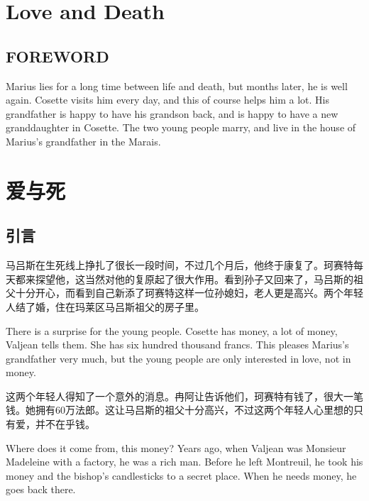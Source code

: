\documentclass[fontset=ubuntu, zihao=5]{ctexart}
\begin{document}
\begin{paracol}{2}

\section{Love and Death}

\subsection*{FOREWORD}

Marius lies for a long time between life and death, but months later, he is well again. Cosette visits him every day, and this of course helps him a lot. His grandfather is happy to have his grandson back, and is happy to have a new granddaughter in Cosette. The two young people marry, and live in the house of Marius's grandfather in the Marais.

\switchcolumn

\section*{爱与死}

\subsection*{引言}

马吕斯在生死线上挣扎了很长一段时间，不过几个月后，他终于康复了。珂赛特每天都来探望他，这当然对他的复原起了很大作用。看到孙子又回来了，马吕斯的祖父十分开心，而看到自己新添了珂赛特这样一位孙媳妇，老人更是高兴。两个年轻人结了婚，住在玛莱区马吕斯祖父的房子里。

\switchcolumn*

There is a surprise for the young people. Cosette has money, a lot of money, Valjean tells them. She has six hundred thousand francs. This pleases Marius's grandfather very much, but the young people are only interested in love, not in money.

\switchcolumn

这两个年轻人得知了一个意外的消息。冉阿让告诉他们，珂赛特有钱了，很大一笔钱。她拥有60万法郎。这让马吕斯的祖父十分高兴，不过这两个年轻人心里想的只有爱，并不在乎钱。

\switchcolumn*

Where does it come from, this money? Years ago, when Valjean was Monsieur Madeleine with a factory, he was a rich man. Before he left Montreuil, he took his money and the bishop's candlesticks to a secret place. When he needs money, he goes back there.



\end{paracol}
\end{document}
